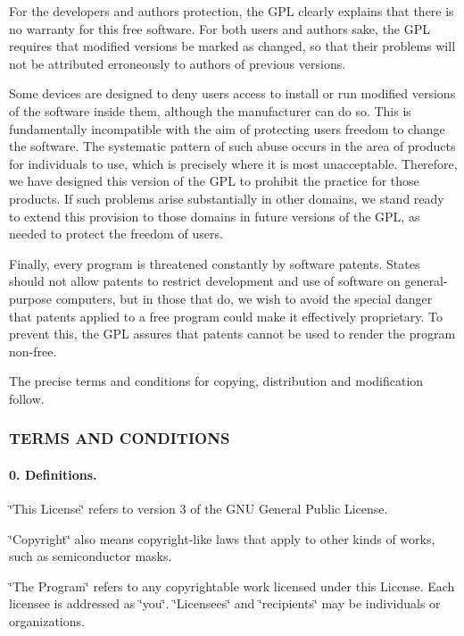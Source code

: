 For the developers\textquotesingle{} and authors\textquotesingle{} protection, the G\+PL clearly explains that there is no warranty for this free software. For both users\textquotesingle{} and authors\textquotesingle{} sake, the G\+PL requires that modified versions be marked as changed, so that their problems will not be attributed erroneously to authors of previous versions.

Some devices are designed to deny users access to install or run modified versions of the software inside them, although the manufacturer can do so. This is fundamentally incompatible with the aim of protecting users\textquotesingle{} freedom to change the software. The systematic pattern of such abuse occurs in the area of products for individuals to use, which is precisely where it is most unacceptable. Therefore, we have designed this version of the G\+PL to prohibit the practice for those products. If such problems arise substantially in other domains, we stand ready to extend this provision to those domains in future versions of the G\+PL, as needed to protect the freedom of users.

Finally, every program is threatened constantly by software patents. States should not allow patents to restrict development and use of software on general-\/purpose computers, but in those that do, we wish to avoid the special danger that patents applied to a free program could make it effectively proprietary. To prevent this, the G\+PL assures that patents cannot be used to render the program non-\/free.

The precise terms and conditions for copying, distribution and modification follow.

\subsubsection*{T\+E\+R\+MS A\+ND C\+O\+N\+D\+I\+T\+I\+O\+NS}

\paragraph*{0. Definitions.}

\char`\"{}\+This License\char`\"{} refers to version 3 of the G\+NU General Public License.

\char`\"{}\+Copyright\char`\"{} also means copyright-\/like laws that apply to other kinds of works, such as semiconductor masks.

\char`\"{}\+The Program\char`\"{} refers to any copyrightable work licensed under this License. Each licensee is addressed as \char`\"{}you\char`\"{}. \char`\"{}\+Licensees\char`\"{} and \char`\"{}recipients\char`\"{} may be individuals or organizations.

